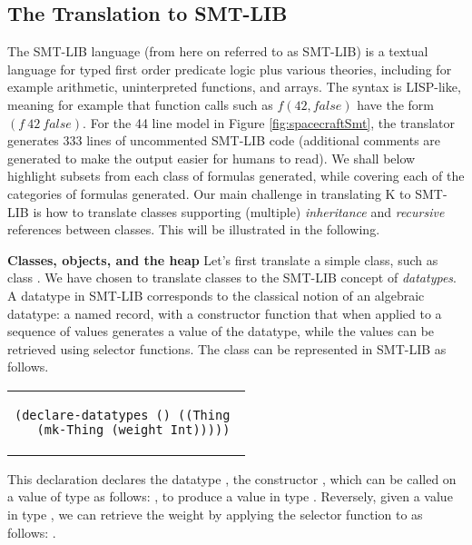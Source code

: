 \subsection{The Translation to SMT-LIB}

The SMT-LIB language (from here on referred to as SMT-LIB) is a textual
language for typed first order predicate logic plus various theories,
including for example arithmetic, uninterpreted functions, and
arrays. The syntax is LISP-like, meaning for example that function
calls such as $f(42,false)$ have the form $(f\ 42\ false)$. For the 44
line \Klang{} model in Figure \ref{fig:spacecraftSmt}, the translator
generates 333 lines of uncommented SMT-LIB code (additional comments
are generated to make the output easier for humans to read). We shall
below highlight subsets from each class of formulas generated, while
covering each of the categories of formulas generated. Our main
challenge in translating K to SMT-LIB is how to translate classes
supporting (multiple) {\em inheritance} and {\em recursive} references
between classes. This will be illustrated in the following.

\textbf{Classes, objects, and the heap} Let's first translate a simple
class, such as class .  We have chosen to translate
classes to the SMT-LIB concept of {\em datatypes}. A datatype in
SMT-LIB corresponds to the classical notion of an algebraic datatype:
a named record, with a constructor function that when applied to a
sequence of values generates a value of the datatype, while the values
can be retrieved using selector functions.  The class 
can be represented in SMT-LIB as follows.

\lstset{language=SMT,numbers=none}

\begin{center}
\begin{tabular}{c}
\small
\begin{lstlisting}
(declare-datatypes () ((Thing 
  (mk-Thing (weight Int)))))
\end{lstlisting}
\end{tabular}
\end{center}

\noindent This declaration declares the datatype , the
constructor , which can be called on a value 
of type  as follows: , to produce a
value in type . Reversely, given a value  in type
, we can retrieve the weight by applying the selector
function  to  as follows: .

